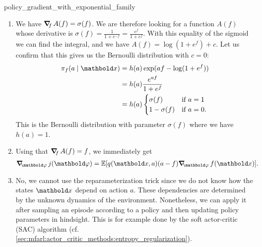 \begin{solution}{policy_gradient_with_exponential_family}
\begin{enumerate}[beginpenalty=10000]
    \item We have $\grad_f A(f) = \sigma(f)$.
    We are therefore looking for a function $A(f)$ whose derivative is $\sigma(f) = \frac{1}{1 + e^{-f}} = \frac{e^f}{1 + e^f}$.
    With this equality of the sigmoid we can find the integral, and we have $A(f) = \log(1 + e^f) + c$.
    Let us confirm that this gives us the Bernoulli distribution with $c = 0$: \begin{align*}
      \pi_f(a \mid \vx) &= h(a) \exp(a f - \log(1 + e^f)) \\
      &= h(a) \frac{e^{a f}}{1 + e^f} \\
      &= h(a) \begin{cases}
        \sigma(f) & \text{if $a = 1$} \\
        1 - \sigma(f) & \text{if $a = 0$}.
      \end{cases}
    \end{align*}
    This is the Bernoulli distribution with parameter $\sigma(f)$ where we have $h(a) = 1$.

    \item Using that $\grad_f A(f) = f$, we immediately get \begin{align*}
      \grad_\vvarphi j(\vvarphi) &= \E{\q{\vx}{a} (a - f) \grad_\vvarphi f(\vx)}.
    \end{align*}

    \item No, we cannot use the reparameterization trick since we do not know how the states $\vx$ depend on action $a$.
    These dependencies are determined by the unknown dynamics of the environment.
    Nonetheless, we can apply it after sampling an episode according to a policy and then updating policy parameters in hindsight.
    This is for example done by the soft actor-critic (SAC) algorithm (cf. \cref{sec:mfarl:actor_critic_methods:entropy_regularization}).
  \end{enumerate}
\end{solution}

